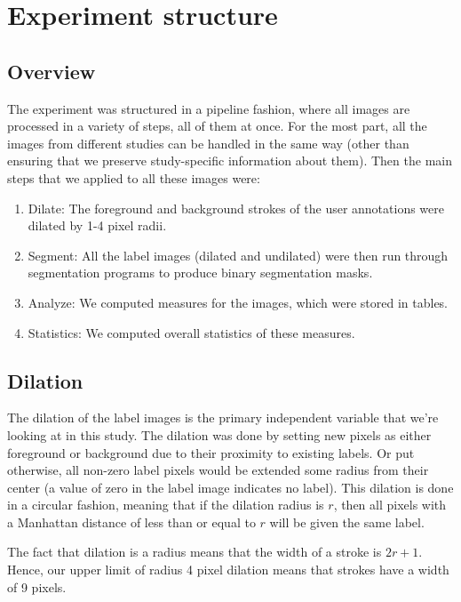 \documentclass[12pt,a4paper,notitlepage]{article}
\begin{document}
\section{Experiment structure}

\subsection{Overview}
The experiment was structured in a pipeline fashion, where all images are processed in a variety of steps, all of them at once. For the most part, all the images from different studies can be handled in the same way (other than ensuring that we preserve study-specific information about them). Then the main steps that we applied to all these images were:

\begin{enumerate}
	\item Dilate: The foreground and background strokes of the user annotations were dilated by 1-4 pixel radii.
	\item Segment: All the label images (dilated and undilated) were then run through segmentation programs to produce binary segmentation masks.
	\item Analyze: We computed measures for the images, which were stored in tables.
	\item Statistics: We computed overall statistics of these measures.
\end{enumerate}

\subsection{Dilation}
The dilation of the label images is the primary independent variable that we're looking at in this study. The dilation was done by setting new pixels as either foreground or background due to their proximity to existing labels. Or put otherwise, all non-zero label pixels would be extended some radius from their center (a value of zero in the label image indicates no label). This dilation is done in a circular fashion, meaning that if the dilation radius is $r$, then all pixels with a Manhattan distance of less than or equal to $r$ will be given the same label.

The fact that dilation is a radius means that the width of a stroke is $2r + 1$. Hence, our upper limit of radius 4 pixel dilation means that strokes have a width of 9 pixels.
\end{document}
